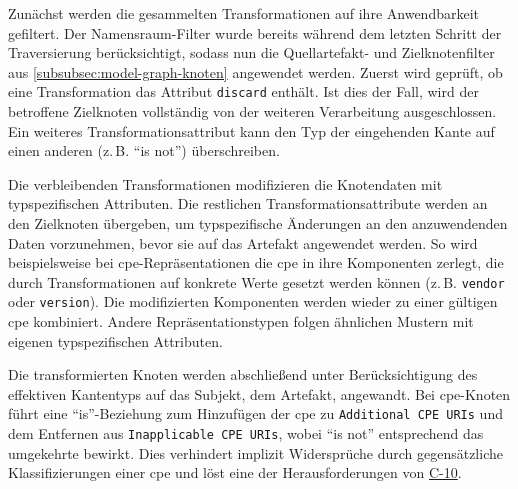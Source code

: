Zunächst werden die gesammelten Transformationen auf ihre Anwendbarkeit gefiltert.
Der Namensraum-Filter wurde bereits während dem letzten Schritt der Traversierung berücksichtigt, sodass nun die Quellartefakt- und Zielknotenfilter aus \autoref{subsubsec:model-graph-knoten} angewendet werden.
Zuerst wird geprüft, ob eine Transformation das Attribut \texttt{discard} enthält.
Ist dies der Fall, wird der betroffene Zielknoten vollständig von der weiteren Verarbeitung ausgeschlossen.
Ein weiteres Transformationsattribut kann den Typ der eingehenden Kante auf einen anderen (z.\,B. \enquote{is not}) überschreiben.

Die verbleibenden Transformationen modifizieren die Knotendaten mit typspezifischen Attributen.
Die restlichen Transformationsattribute werden an den Zielknoten übergeben, um typspezifische Änderungen an den anzuwendenden Daten vorzunehmen, bevor sie auf das Artefakt angewendet werden.
So wird beispielsweise bei \acrshort{cpe}-Repräsentationen die \acrshort{cpe} in ihre Komponenten zerlegt, die durch Transformationen auf konkrete Werte gesetzt werden können (z.\,B. \texttt{vendor} oder \texttt{version}).
Die modifizierten Komponenten werden wieder zu einer gültigen \acrshort{cpe} kombiniert.
Andere Repräsentationstypen folgen ähnlichen Mustern mit eigenen typspezifischen Attributen.

Die transformierten Knoten werden abschließend unter Berücksichtigung des effektiven Kantentyps auf das Subjekt, dem Artefakt, angewandt.
Bei \acrshort{cpe}-Knoten führt eine \enquote{is}-Beziehung zum Hinzufügen der \acrshort{cpe} zu \texttt{Additional CPE URIs} und dem Entfernen aus \texttt{Inapplicable CPE URIs}, wobei \enquote{is not} entsprechend das umgekehrte bewirkt.
Dies verhindert implizit Widersprüche durch gegensätzliche Klassifizierungen einer \acrshort{cpe} und löst eine der Herausforderungen von \hyperref[subsec:c-10-order-dependency]{C-10}.
